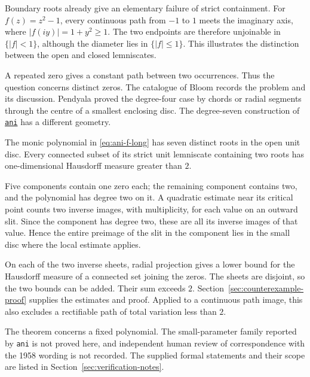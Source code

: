 Boundary roots already give an elementary failure of strict containment.
For $f(z)=z^2-1$, every continuous path from $-1$ to $1$ meets the
imaginary axis, where $|f(iy)|=1+y^2\ge1$. The two endpoints are therefore
unjoinable in $\{|f|<1\}$, although the diameter lies in $\{|f|\le1\}$.
This illustrates the distinction between the open and closed lemniscates.

A repeated zero gives a constant path between two occurrences. Thus the
question concerns distinct zeros. The catalogue of Bloom \cite{bloom}
records the problem and its discussion. Pendyala
\cite[Theorem~1 and Lemma~1]{june2026} proved the degree-four case by
chords or radial segments through the centre of a smallest enclosing disc.
The degree-seven construction of
\href{https://www.erdosproblems.com/forum/thread/1041\#post-8861}{\texttt{ani}}
has a different geometry.

\begin{theorem}\label{res:ani-degree-seven-counterexample-long}
The monic polynomial in \eqref{eq:ani-f-long} has seven distinct roots
in the open unit disc. Every connected subset of its strict unit
lemniscate containing two roots has one-dimensional Hausdorff measure
greater than $2$.
\end{theorem}

Five components contain one zero each; the remaining component
contains two, and the polynomial has degree two on it. A quadratic
estimate near its critical point counts two inverse images, with
multiplicity, for each value on an outward slit. Since the component has degree two, these
are all its inverse images of that value. Hence the entire preimage
of the slit in the component lies in the small disc where the local
estimate applies.

On each of the two inverse sheets, radial projection gives a lower
bound for the Hausdorff measure of a connected set joining the zeros.
The sheets are disjoint, so the two bounds can be added. Their sum
exceeds $2$.
Section~\ref{sec:counterexample-proof} supplies the estimates and proof.
Applied to a continuous path image, this also excludes a rectifiable
path of total variation less than $2$.

The theorem concerns a fixed polynomial. The small-parameter family
reported by \texttt{ani} is not proved here, and independent human review
of correspondence with the 1958 wording is not recorded. The supplied
formal statements and their scope are listed in
Section~\ref{sec:verification-notes}.

